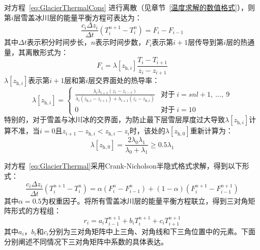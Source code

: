 对方程~\eqref{eq:GlacierThermalCons} 进行离散（见章节~\ref{温度求解的数值格式}），则第$i$层雪盖冰川层的能量平衡方程可表达为：
\begin{equation}\label{eq:GlacierThermal}
  \frac{c_i \Delta z_i}{\Delta t} \left(T^{n+1}_i - T^n_i\right) = F_i - F_{i-1}
\end{equation}
其中$\Delta t$表示积分时间步长，$n$表示时间步数，$F_i$表示第$i+1$层传导到第$i$层的热通量，其离散形式为：
\begin{equation}
  F_i = \lambda \left[z_{\mathrm{h},i}\right] \frac{T_i-T_{i+1}}{z_i-z_{i+1}}
\end{equation}
$\lambda\left[z_{\mathrm{h},i}\right]$表示第$i+1$层和第$i$层交界面处的热导率：
\begin{equation}
  \lambda \left[z_{\mathrm{h},i}\right] = \begin{cases}
    \frac{\lambda_i\lambda_{i+1}\left(z_i-z_{i-1}\right)}{\lambda_i\left(z_{\mathrm{h},i}-z_{i+1}\right)+\lambda_{\mathrm{i+1}}\left(z_i-z_{\mathrm{h},i}\right)}  &\text{对于}\ i=snl+1,\ \ldots,\ 9 \\
    0 &\text{对于}\ i=10
  \end{cases}
\end{equation}
特别的，对于雪盖与冰川冰的交界面，为防止最下层雪层厚度过大导致$\lambda\left[z_{\mathrm{h},i}\right]$计算不准，当$i=0$且$z_{i+1}-z_{\mathrm{h},i}<z_{\mathrm{h},i}-z_i$时，该处的$\lambda\left[z_{\mathrm{h,0}}\right]$重新计算为：
\begin{equation}
  \lambda\left[z_{\mathrm{h,0}}\right]=\frac{2\lambda_0\lambda_1}{\lambda_0+\lambda_1} \geqslant 0.5\lambda_1
\end{equation}

对方程~\eqref{eq:GlacierThermal}采用Crank-Nicholson半隐式格式求解，得到以下形式：
\begin{equation}
  \frac{c_i\Delta z_i}{\Delta t}\left(T^{n+1}_i - T^n_i\right)=\alpha \left(F^n_i - F^n_{i-1}\right) + \left(1-\alpha \right) \left(F^{n+1}_i - F^{n+1}_{i-1}\right)
\end{equation}
其中$\alpha = 0.5$为权重因子。将所有雪盖冰川层的能量平衡方程联立，得到三对角矩阵形式的方程组：
\begin{equation}
  r_i = a_i T^{n+1}_{i-1} + b_i T^{n+1}_i + c_i T^{n+1}_{i+1}
\end{equation}
其中$a_i$，$b_i$和$c_i$分别为三对角矩阵中上三角、对角线和下三角位置中的元素。下面分别阐述不同情况下三对角矩阵中系数的具体表达。

